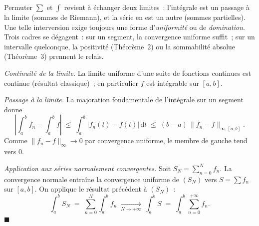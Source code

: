 \begin{significationintuitive}
Permuter $\sum$ et $\int$ revient à échanger deux limites~: l'intégrale est
un passage à la limite (sommes de Riemann), et la série en est un autre
(sommes partielles). Une telle interversion exige toujours une forme
d'\emph{uniformité} ou de \emph{domination}. Trois cadres se dégagent~:
sur un segment, la convergence uniforme suffit~; sur un intervalle
quelconque, la positivité (Théorème~2) ou la sommabilité absolue
(Théorème~3) prennent le relais.
\end{significationintuitive}

\decsep{}



\begin{mdframed}[style=proofbar]
  \textit{Continuité de la limite.}\enspace%
  La limite uniforme d'une suite de fonctions continues est continue
  (résultat classique)~; en particulier $f$ est intégrable sur $[a,b]$.

  \medskip
  \textit{Passage à la limite.}\enspace%
  La majoration fondamentale de l'intégrale sur un segment donne
  \[
    \left|\int_a^b f_n - \int_a^b f\right|
    \;\leq\; \int_a^b |f_n(t) - f(t)|\,\mathrm{d}t
    \;\leq\; (b-a)\,\|f_n - f\|_{\infty,[a,b]}.
  \]
  Comme $\|f_n - f\|_\infty \to 0$ par convergence uniforme, le membre
  de gauche tend vers $0$.

  \medskip
  \textit{Application aux séries normalement convergentes.}\enspace%
  Soit $S_N = \sum_{n=0}^{N} f_n$. La convergence normale entraîne la
  convergence uniforme de $(S_N)$ vers $S = \sum f_n$ sur $[a,b]$. On
  applique le résultat précédent à $(S_N)$~:
  \[
    \int_a^b S_N \;=\; \sum_{n=0}^{N}\int_a^b f_n
    \;\xrightarrow[N\to+\infty]{}\;
    \int_a^b S \;=\; \int_a^b \sum_{n=0}^{+\infty} f_n.
  \]
  \hfill$\blacksquare$
\end{mdframed}


